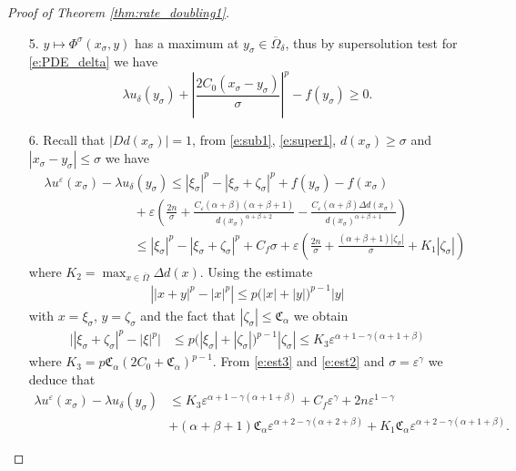 \documentclass[11pt,reqno]{amsart}
\numberwithin{figure}{section}
\theoremstyle{plain}
\theoremstyle{remark}
\numberwithin{equation}{section}
\begin{document}
\begin{proof}[Proof of Theorem \ref{thm:rate_doubling1}]
\begin{enumerate}
\item[5.] $y\mapsto \Phi^\sigma(x_\sigma,y)$ has a maximum at $y_\sigma\in \overline{\Omega}_\delta$, thus by supersolution test for \eqref{e:PDE_delta} we have 
\begin{equation}\label{e:super1}
    \lambda u_\delta(y_\sigma) + \left|\frac{2C_0(x_\sigma-y_\sigma)}{\sigma}\right|^p - f(y_\sigma) \geq 0.
\end{equation}
\item[6.] Recall that $|D d(x_\sigma)| = 1$, from \eqref{e:sub1}, \eqref{e:super1}, $d(x_\sigma)\geq \sigma$ and $|x_\sigma-y_\sigma|\leq \sigma$ we have
\begin{align}
    &\lambda u^\varepsilon(x_\sigma) - \lambda u_\delta(y_\sigma) \leq |\xi_\sigma|^p - |\xi_\sigma+\zeta_\sigma|^p + f(y_\sigma) - f(x_\sigma) \nonumber\\
    &\qquad\qquad\qquad\quad + \varepsilon\left(\frac{2n}{\sigma} + \frac{C_\varepsilon(\alpha+\beta)(\alpha+\beta+1)}{d(x_\sigma)^{\alpha+\beta+2}} - \frac{C_\varepsilon(\alpha+\beta)\Delta d(x_\sigma)}{d(x_\sigma)^{\alpha+\beta +1}}\right)\nonumber \\
    &\qquad\qquad\qquad\quad\leq |\xi_\sigma|^p - |\xi_\sigma+\zeta_\sigma|^p + C_f\sigma +\varepsilon \left(\frac{2n}{\sigma} + \frac{(\alpha+\beta+1)|\zeta_\sigma|}{\sigma} + K_1|\zeta_\sigma|\right) \label{e:est3}
\end{align}
where $K_2 = \max_{x\in \overline{\Omega}}\Delta d(x)$. Using the estimate
\begin{align*}
    \left||x+y|^p - |x|^p \right| \leq  p\big(|x|+|y|\big)^{p-1}|y|
\end{align*}
with $x = \xi_\sigma$, $y = \zeta_\sigma$ and the fact that $|\zeta_\sigma|\leq \mathfrak{C}_\alpha$ we obtain
\begin{align}
    \Big||\xi_\sigma+\zeta_\sigma|^p - |\xi|^p\Big| &\leq p\Big(|\xi_\sigma|+|\zeta_\sigma|\Big)^{p-1}|\zeta_\sigma| \leq K_3\varepsilon ^{\alpha+1  - \gamma(\alpha+1+\beta)}\label{e:est2}
\end{align}
where $K_3 = p\mathfrak{C}_\alpha(2C_0+\mathfrak{C}_\alpha)^{p-1}$. From \eqref{e:est3} and \eqref{e:est2} and $\sigma = \varepsilon^\gamma$ we deduce that
\begin{align*}
    \lambda u^\varepsilon(x_\sigma) - \lambda u_\delta(y_\sigma) &\leq   K_3\varepsilon^{\alpha+1 - \gamma(\alpha+1+\beta)}+ C_f\varepsilon^\gamma + 2n \varepsilon^{1-\gamma}\\
    & + (\alpha+\beta + 1)\mathfrak{C}_\alpha \varepsilon^{\alpha+2 - \gamma(\alpha+2+\beta)} + K_1\mathfrak{C}_\alpha\varepsilon^{\alpha+2 - \gamma(\alpha+1+\beta)}.

\end{align*}
\end{enumerate}
\end{proof}
\end{document}

